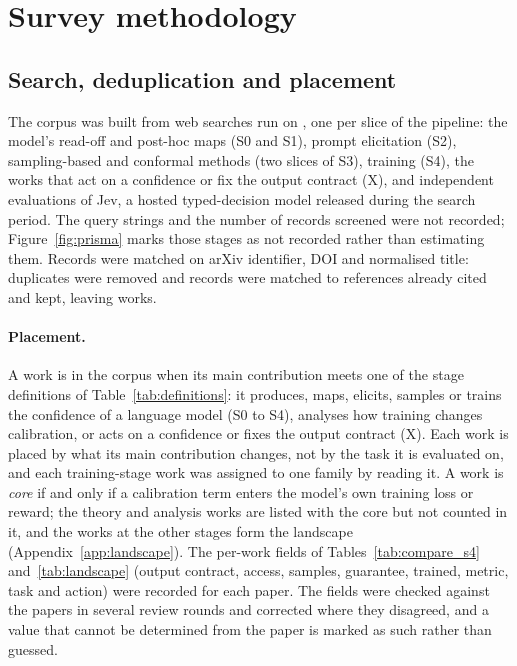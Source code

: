\section{Survey methodology}
\label{sec:method}

\subsection{Search, deduplication and placement}
\label{sec:search}

The corpus was built from \nStreams web searches run on \searchDate, one per slice of the pipeline: the
model's read-off and post-hoc maps (S0 and S1), prompt elicitation (S2), sampling-based and conformal
methods (two slices of S3), training (S4), the works that act on a confidence or fix the output
contract (X), and independent evaluations of Jev, a hosted typed-decision model released during the
search period. The query strings and the number of records screened
were not recorded; Figure~\ref{fig:prisma} marks those stages as not recorded rather than estimating
them. Records were matched on arXiv identifier, DOI and normalised title: \nDup duplicates were removed
and \nMapped records were matched to references already cited and kept, leaving \nWorks works.



\paragraph{Placement.} A work is in the corpus when its main contribution meets one of the stage
definitions of Table~\ref{tab:definitions}: it produces, maps, elicits, samples or trains the confidence
of a language model (S0 to S4), analyses how training changes calibration, or acts on a confidence or
fixes the output contract (X). Each work is placed by what its main contribution changes, not by the
task it is evaluated on, and each training-stage work was assigned to one family by reading it. A work is
\emph{core} if and only if a calibration term enters the model's own training loss or reward; the
\nTheory theory and analysis works are listed with the core but not counted in it, and the \nLandscape
works at the other stages form the landscape (Appendix~\ref{app:landscape}). The per-work fields of
Tables~\ref{tab:compare_s4} and~\ref{tab:landscape} (output contract, access, samples, guarantee,
trained, metric, task and action) were recorded for each paper. The fields were checked against the papers in
several review rounds and corrected where they disagreed, and a value that cannot be
determined from the paper is marked as such rather than guessed.

